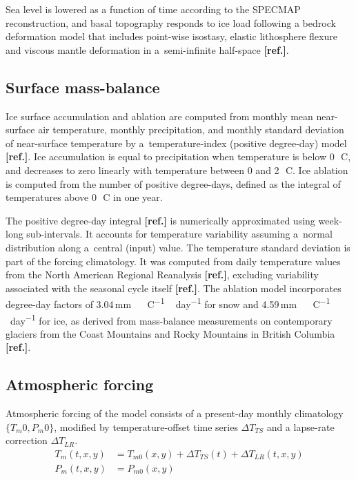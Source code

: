 \documentclass[tc, ms]{copernicus}
\newcommand{\aref}[0]{\textbf{[ref.]}}
\renewcommand{\citep}[1]{\aref}
\renewcommand{\citet}[1]{\aref}
\begin{document}
Sea level is lowered as a function of time according to the SPECMAP
reconstruction, and basal topography responds to ice load
following a bedrock deformation model that includes point-wise isostasy,
elastic lithosphere flexure and viscous mantle deformation in a~semi-infinite
half-space \citep{lingle-clark-1985,bueler-etal-2007}.

\subsection{Surface mass-balance}

Ice surface accumulation and ablation are computed from monthly mean
near-surface air temperature, monthly precipitation, and monthly standard
deviation of near-surface temperature by a~temperature-index (positive
degree-day) model \citep{hock-2003}. Ice accumulation is equal to precipitation
when temperature is below 0\,\unit{{\degree}C}, and decreases to zero linearly
with temperature between 0 and 2\,\unit{{\degree}C}. Ice ablation is computed
from the number of positive degree-days, defined as the integral of
temperatures above 0\,\unit{{\degree}C} in one year.

The positive degree-day integral \citep{calov-greve-2005} is numerically
approximated using week-long sub-intervals. It accounts for temperature
variability assuming a~normal distribution along a~central (input) value. The
temperature standard deviation is part of the forcing climatology. It was
computed from daily temperature values from the North American Regional
Reanalysis \citep{data:narr}, excluding variability associated with the
seasonal cycle itself \citet{seguinot-rogozhina-2014}. The
ablation model incorporates degree-day factors of
3.04\,\unit{mm\,{\degree}C^{-1}\,day^{-1}} for snow and
4.59\,\unit{mm\,{\degree}C^{-1}\,day^{-1}} for ice, as derived from
mass-balance measurements on contemporary glaciers from the Coast Mountains and
Rocky Mountains in British Columbia \citep{shea-etal-2009}.

\subsection{Atmospheric forcing}

Atmospheric forcing of the model consists of a present-day monthly climatology
$\{T_m0, P_m0\}$, modified by temperature-offset time series ${\Delta}T_{TS}$
and a lapse-rate correction ${\Delta}T_{LR}$.
\begin{align}
    T_m(t, x, y) &= T_{m0}(x, y) + {\Delta}T_{TS}(t) + {\Delta}T_{LR}(t, x, y) \\
    P_m(t, x, y) &= P_{m0}(x, y)
\end{align}
\end{document}
